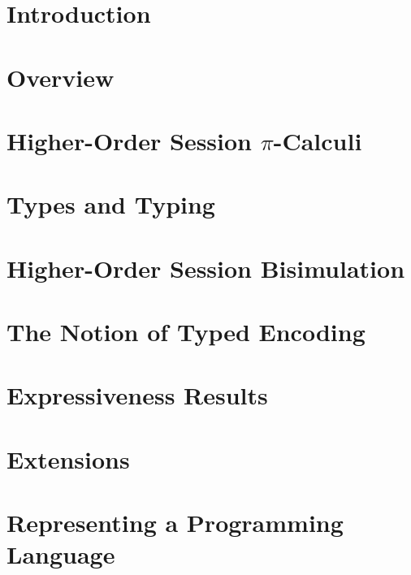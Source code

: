 \documentclass[preprint,nocopyrightspace]{sigplanconf}
\begin{document}
%

\section{Introduction}
\label{sec:intro}


\section{Overview} %
%

\section{Higher-Order Session $\pi$-Calculi}
\label{sec:calculus}


\section{Types and Typing}
%

\section{Higher-Order Session Bisimulation}
%

\section{The Notion of Typed Encoding}
\label{s:expr}


\section{Expressiveness Results}
\label{sec:positive}




\section{Extensions}
\label{sec:extension}


\section{Representing a Programming Language}
\label{implementation}

\end{document}
